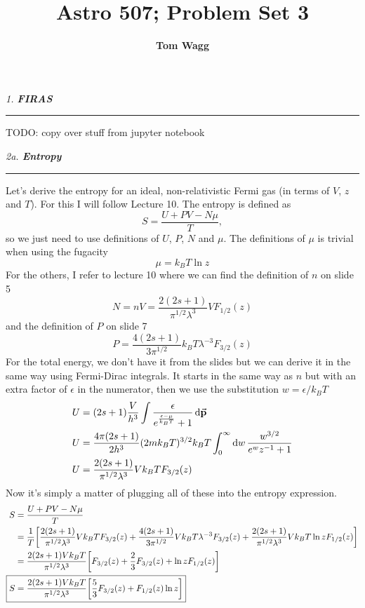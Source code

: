 \documentclass[12pt, letterpaper, twoside]{article}
\title{Astro 507; Problem Set 3}
\author{\textbf{Tom Wagg}}
\newcommand{\question}[1]{{\noindent \it #1}}
\newcommand{\answer}[1]{
    \par\noindent\rule{\textwidth}{0.4pt}#1\vspace{0.5cm}
}
\newcommand{\todo}[1]{{\color{red}\begin{center}TODO: #1\end{center}}}
\begin{document}
\maketitle

\question{1. \textbf{FIRAS}}
\answer{
    \todo{copy over stuff from jupyter notebook}
}

\question{2a. \textbf{Entropy}}
\answer{
    Let's derive the entropy for an ideal, non-relativistic Fermi gas (in terms of $V$, $z$ and $T$). For this I will follow Lecture 10. The entropy is defined as
    \begin{equation}
        S = \frac{U + PV - N \mu}{T},
    \end{equation}
    so we just need to use definitions of $U$, $P$, $N$ and $\mu$. The definitions of $\mu$ is trivial when using the fugacity
    \begin{equation}
        \mu = k_B T \ln z
    \end{equation}
    For the others, I refer to lecture 10 where we can find the definition of $n$ on slide 5
    \begin{equation}
        N = n V = \frac{2(2s + 1)}{\pi^{1/2} \lambda^3} V F_{1/2}(z)
    \end{equation}
    and the definition of $P$ on slide 7
    \begin{equation}
        P = \frac{4(2s + 1)}{3 \pi^{1/2}} k_B T \lambda^{-3} F_{3/2}(z)
    \end{equation}
    For the total energy, we don't have it from the slides but we can derive it in the same way using Fermi-Dirac integrals. It starts in the same way as $n$ but with an extra factor of $\epsilon$ in the numerator, then we use the substitution $w = \epsilon / k_B T$
    \begin{align}
        U &= (2s + 1) \frac{V}{h^3} \int \frac{\epsilon}{e^{\frac{\epsilon - \mu}{k_B T}} + 1} \dd{\va{p}} \\
        U &= \frac{4\pi (2s + 1)}{2 h^3} (2 m k_B T)^{3/2} k_B T \int_0^\infty \dd{w} \frac{w^{3/2}}{e^w z^{-1} + 1} \\
        U &= \frac{2(2s + 1)}{\pi^{1/2} \lambda^3} V k_B T F_{3/2}(z)
    \end{align}
    Now it's simply a matter of plugging all of these into the entropy expression.
    \begin{align}
        S &= \frac{U + PV - N \mu}{T} \\
          &= \frac{1}{T} \qty[ \frac{2(2s + 1)}{\pi^{1/2} \lambda^3} V k_B T F_{3/2}(z) + \frac{4(2s + 1)}{3 \pi^{1/2}} V k_B T \lambda^{-3} F_{3/2}(z) + \frac{2(2s + 1)}{\pi^{1/2} \lambda^3} V k_B T \ln z F_{1/2}(z)] \\
          &= \frac{2(2s + 1) V k_B T}{\pi^{1/2} \lambda^3} \qty[ F_{3/2}(z) + \frac{2}{3} F_{3/2}(z) + \ln z F_{1/2}(z)] \\
        \Aboxed{ S &= \frac{2(2s + 1) V k_B T}{\pi^{1/2} \lambda^3} \qty[ \frac{5}{3} F_{3/2}(z) + F_{1/2}(z) \ln z] }
    \end{align}
}
\end{document}
